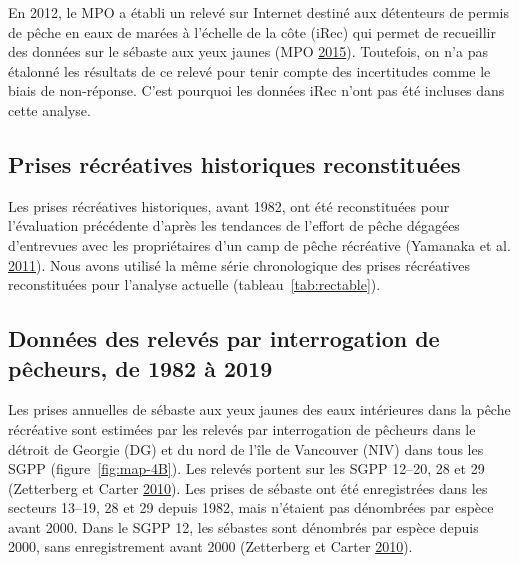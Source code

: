 \documentclass[french,11pt]{book}
\begin{document}
\hypertarget{sec:rec-catch-data}{%
\label{sec:rec-catch-data}}

En 2012, le MPO a établi un relevé sur Internet destiné aux détenteurs de permis de pêche en eaux de marées à l'échelle de la côte (iRec) qui permet de recueillir des données sur le sébaste aux yeux jaunes (MPO \protect\hyperlink{ref-dfo2015}{2015}). Toutefois, on n'a pas étalonné les résultats de ce relevé pour tenir compte des incertitudes comme le biais de non-réponse. C'est pourquoi les données iRec n'ont pas été incluses dans cette analyse.

\hypertarget{sec:recon-rec-catch-data}{%
\subsection{Prises récréatives historiques reconstituées}\label{sec:recon-rec-catch-data}}

Les prises récréatives historiques, avant 1982, ont été reconstituées pour l'évaluation précédente d'après les tendances de l'effort de pêche dégagées d'entrevues avec les propriétaires d'un camp de pêche récréative (Yamanaka et al. \protect\hyperlink{ref-yamanaka2011}{2011}). Nous avons utilisé la même série chronologique des prises récréatives reconstituées pour l'analyse actuelle (tableau~\ref{tab:rectable}).

\hypertarget{sec:creel-catch-data}{%
\subsection{Données des relevés par interrogation de pêcheurs, de 1982 à 2019}\label{sec:creel-catch-data}}

Les prises annuelles de sébaste aux yeux jaunes des eaux intérieures dans la pêche récréative sont estimées par les relevés par interrogation de pêcheurs dans le détroit de Georgie (DG) et du nord de l'île de Vancouver (NIV) dans tous les SGPP (figure~\ref{fig:map-4B}). Les relevés portent sur les SGPP 12--20, 28 et 29 (Zetterberg et Carter \protect\hyperlink{ref-zetterberg2010}{2010}). Les prises de sébaste ont été enregistrées dans les secteurs 13--19, 28 et 29 depuis 1982, mais n'étaient pas dénombrées par espèce avant 2000. Dans le SGPP 12, les sébastes sont dénombrés par espèce depuis 2000, sans enregistrement avant 2000 (Zetterberg et Carter \protect\hyperlink{ref-zetterberg2010}{2010}).
\end{document}
